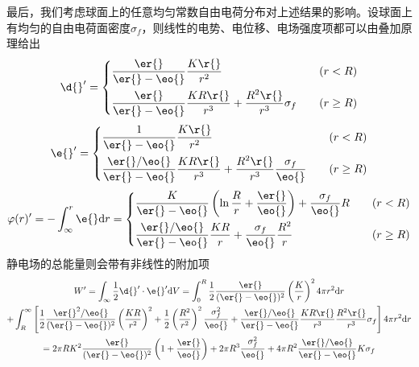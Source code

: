     

    最后，我们考虑球面上的任意均匀常数自由电荷分布对上述结果的影响。设球面上有均匀的自由电荷面密度$\sigma_f$，则线性的电势、电位移、电场强度项都可以由叠加原理给出
    \begin{equation}
        \d{}'=
        \left\{
        \begin{aligned}
        	&\frac{\er{}}{\er{}-\eo{}}\frac{K\r{}}{r^2} &\quad (r<R) \\
        	&\frac{\er{}}{\er{}-\eo{}}\frac{KR\r{}}{r^3} + \frac{R^2\r{}}{r^3}\sigma_f &\quad (r\ge R) 
    	\end{aligned}
        \right.
    \end{equation}
    \begin{equation}
        \e{}'=
        \left\{
        \begin{aligned}
        	&\frac{1}{\er{}-\eo{}}\frac{K\r{}}{r^2} &\quad (r<R) \\
        	&\frac{\er{}/\eo{}}{\er{}-\eo{}}\frac{KR\r{}}{r^3} + \frac{R^2\r{}}{r^3}\frac{\sigma_f}{\eo{}} &\quad (r\ge R) 
    	\end{aligned}
        \right.
    \end{equation}
    \begin{equation}
        \varphi(r)' = -\int_{\infty}^r\e{}\mathrm{d}r = 
        \left\{
        \begin{aligned}
        	&\frac{K}{\er{}-\eo{}}\left(\ln \frac{R}{r}+\frac{\er{}}{\eo{}}\right) + \frac{\sigma_f}{\eo{}}R&\quad (r<R) \\
        	&\frac{\er{}/\eo{}}{\er{}-\eo{}}\frac{KR}{r} + \frac{\sigma_f}{\eo{}}\frac{R^2}{r} &\quad (r\ge R) 
    	\end{aligned}
        \right.
    \end{equation}
    静电场的总能量则会带有非线性的附加项
    \begin{multline}
        W'=\int_\infty \frac{1}{2}\d{}'\cdot\e{}'\mathrm{d}V=
        \int_0^R\frac{1}{2}\frac{\er{}}{(\er{}-\eo{})^2}\left(\frac{K}{r}\right)^2 4\pi r^2\mathrm{d}r \\
        + \int_R^\infty \left[ \frac{1}{2}\frac{\er{}^2/\eo{}}{(\er{}-\eo{})^2}\left(\frac{KR}{r^2}\right)^2 
        + \frac{1}{2}\left(\frac{R^2}{r^2}\right)^2\frac{\sigma_f^2}{\eo{}}
        + \frac{\er{}/\eo{}}{\er{}-\eo{}}\frac{KR\r{}}{r^3} \frac{R^2\r{}}{r^3}\sigma_f 
        \right] 4\pi r^2 \mathrm{d}r\\
        = 2\pi R K^2\frac{\er{}}{(\er{}-\eo{})^2}\left(1+\frac{\er{}}{\eo{}}\right)
        + 2\pi R^3 \frac{\sigma_f^2}{\eo{}} + 4\pi R^2 \frac{\er{}/\eo{}}{\er{}-\eo{}} K \sigma_f
    \end{multline}
